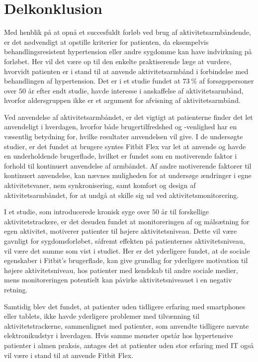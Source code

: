 \section{Delkonklusion}

Med henblik på at opnå et succesfuldt forløb ved brug af aktivitetsarmbåndende, er det nødvendigt at opstille kriterier for patienten, da eksempelvis behandlingsresistent hypertension eller andre sygdomme kan have indvirkning på forløbet. Her vil det være op til den enkelte praktiserende læge at vurdere, hvorvidt patienten er i stand til at anvende aktivitetsarmbånd i forbindelse med behandlingen af hypertension. Det er i et studie fundet at $73~\%$ af forsøgspersoner over $50$ år efter endt studie, havde interesse i anskaffelse af aktivitetsarmbånd, hvorfor aldersgruppen ikke er et argument for afvisning af aktivitetsarmbånd.

Ved anvendelse af aktivitetsarmbåndet, er det vigtigt at patienterne finder det let anvendeligt i hverdagen, hvorfor både brugertilfredshed og -venlighed har en væsentlig betydning for, hvilke resultater anvendelsen vil give. I de undersøgte studier, er det fundet at brugere syntes Fitbit Flex var let at anvende og havde en underholdende brugerflade, hvilket er fundet som en motiverende faktor i forhold til kontinuert anvendelse af armbåndet. Af andre motiverende faktorer til kontinuert anvendelse, kan nævnes muligheden for at undersøge ændringer i egne aktivitetsvaner, nem synkronisering, samt komfort og design af aktivitetsarmbåndet, for at undgå at skille sig ud ved aktivitetsmonitorering.

I et studie, som introducerede kronisk syge over $50$ år til forskellige aktivitetstrackere, er det desuden fundet at monitoreringen af og målsætning for egen aktivitet, motiverer patienter til højere aktivitetsniveau. Dette vil være gavnligt for sygdomsforløbet, såfremt effekten på patienternes aktivitetsniveau, vil være det samme som vist i studiet. Her er det yderligere fundet, at de sociale egenskaber i Fitbit's brugerflade, kan give grundlag for yderligere motivation til højere aktivitetsniveau, hos patienter med kendskab til andre sociale medier, mens monitoreringen potentielt kan påvirke aktivitetsniveauet i en negativ retning.

Samtidig blev det fundet, at patienter uden tidligere erfaring med smartphones eller tablets, ikke havde yderligere problemer med tilvænning til aktivitetstrackerne, sammenlignet med patienter, som anvendte tidligere nævnte elektronikudstyr i hverdagen. Hvis samme mønster opstår hos hypertensive patienter i almen praksis, antages det at patienter uden stor erfaring med IT også vil være i stand til at anvende Fitbit Flex. 

